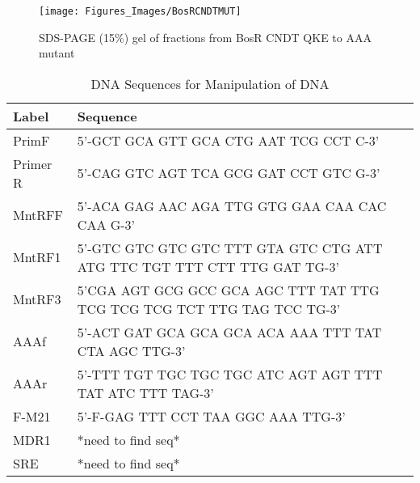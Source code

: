 \documentclass[12pt,twoside]{reedthesis}
\begin{document}
  		 \begin{figure}[h!tbp]
  		 	\centering
  		 	\texttt{[image: Figures\_Images/BosRCNDTMUT]}
  		 	\caption[Purification of BosR CNDT Mutant QKE --> AAA]{SDS-PAGE (15\%) gel of fractions from BosR CNDT QKE to AAA mutant}
  		 	\label{BosRmutCNDTPurification}
  		 \end{figure}
  
  
  
   
\appendix

 
 \begin{table}[!hp]
 	\caption{DNA Sequences for Manipulation of DNA} 
 	\label{DNAsequences}
 	\begin{tabular}{|l | p{12cm}|}
 		\hline
 		Label & Sequence \\
 		\hline 
 		PrimF & 5'-GCT GCA GTT GCA CTG AAT TCG CCT C-3'  \\ 
 		\hline
 		Primer R  & 5'-CAG GTC AGT TCA GCG GAT CCT GTC G-3' \\  			
 		\hline
 		MntRFF & 5'-ACA GAG AAC AGA TTG GTG GAA CAA CAC CAA G-3'    \\
 		\hline
 		MntRF1  & 5'-GTC GTC GTC GTC TTT GTA GTC CTG ATT ATG TTC TGT TTT CTT TTG GAT TG-3'  \\ 
 		\hline
 		MntRF3 & 5'CGA AGT GCG GCC GCA AGC TTT TAT TTG TCG TCG TCG TCT TTG TAG TCC TG-3'  \\  
 		\hline
 		AAAf & 5'-ACT GAT GCA GCA GCA ACA AAA TTT TAT CTA AGC TTG-3'  \\     
 		\hline
 		AAAr & 5'-TTT TGT TGC TGC TGC ATC AGT AGT TTT TAT ATC TTT TAG-3' \\
 		\hline
 		F-M21 & 5'-F-GAG TTT CCT TAA GGC AAA TTG-3'  \\
 		\hline
 		MDR1 & *need to find seq* \\  
 		\hline
 		SRE & *need to find seq*  \\
 		\hline
 	\end{tabular}
 \end{table}

   
\end{document}

